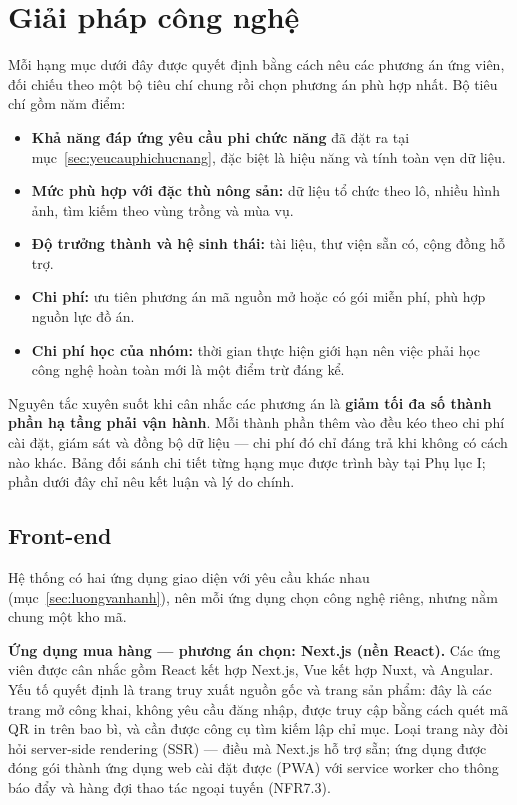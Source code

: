 \section{Giải pháp công nghệ}
\label{sec:giaiphapcongnghe}

Mỗi hạng mục dưới đây được quyết định bằng cách nêu các phương án ứng viên, đối chiếu theo một bộ tiêu chí chung rồi chọn phương án phù hợp nhất. Bộ tiêu chí gồm năm điểm:
\begin{itemize}
    \item \textbf{Khả năng đáp ứng yêu cầu phi chức năng} đã đặt ra tại mục~\ref{sec:yeucauphichucnang}, đặc biệt là hiệu năng và tính toàn vẹn dữ liệu.
    \item \textbf{Mức phù hợp với đặc thù nông sản:} dữ liệu tổ chức theo lô, nhiều hình ảnh, tìm kiếm theo vùng trồng và mùa vụ.
    \item \textbf{Độ trưởng thành và hệ sinh thái:} tài liệu, thư viện sẵn có, cộng đồng hỗ trợ.
    \item \textbf{Chi phí:} ưu tiên phương án mã nguồn mở hoặc có gói miễn phí, phù hợp nguồn lực đồ án.
    \item \textbf{Chi phí học của nhóm:} thời gian thực hiện giới hạn nên việc phải học công nghệ hoàn toàn mới là một điểm trừ đáng kể.
\end{itemize}

Nguyên tắc xuyên suốt khi cân nhắc các phương án là \textbf{giảm tối đa số thành phần hạ tầng phải vận hành}. Mỗi thành phần thêm vào đều kéo theo chi phí cài đặt, giám sát và đồng bộ dữ liệu --- chi phí đó chỉ đáng trả khi không có cách nào khác. Bảng đối sánh chi tiết từng hạng mục được trình bày tại Phụ lục I; phần dưới đây chỉ nêu kết luận và lý do chính.

\subsection{Front-end}

Hệ thống có hai ứng dụng giao diện với yêu cầu khác nhau (mục~\ref{sec:luongvanhanh}), nên mỗi ứng dụng chọn công nghệ riêng, nhưng nằm chung một kho mã.

\noindent\textbf{Ứng dụng mua hàng --- phương án chọn: Next.js (nền React).} Các ứng viên được cân nhắc gồm React kết hợp Next.js, Vue kết hợp Nuxt, và Angular. Yếu tố quyết định là trang truy xuất nguồn gốc và trang sản phẩm: đây là các trang mở công khai, không yêu cầu đăng nhập, được truy cập bằng cách quét mã QR in trên bao bì, và cần được công cụ tìm kiếm lập chỉ mục. Loại trang này đòi hỏi server-side rendering (SSR) --- điều mà Next.js hỗ trợ sẵn; ứng dụng được đóng gói thành ứng dụng web cài đặt được (PWA) với service worker cho thông báo đẩy và hàng đợi thao tác ngoại tuyến (NFR7.3).


